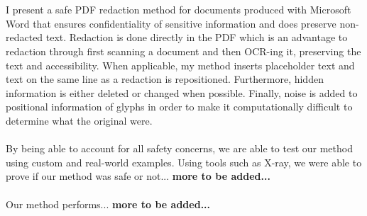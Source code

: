 \\\\
I present a safe PDF redaction method for documents produced with Microsoft Word that ensures confidentiality of sensitive information and does preserve non-redacted text. Redaction is done directly in the PDF which is an advantage to redaction through first scanning a document and then OCR-ing it, preserving the text and accessibility. When applicable, my method inserts placeholder text and text on the same line as a redaction is repositioned. Furthermore, hidden information is either deleted or changed when possible. Finally, noise is added to positional information of glyphs in order to make it computationally difficult to determine what the original were. 
\\\\
By being able to account for all safety concerns, we are able to test our method using custom and real-world examples. Using tools such as X-ray, we were able to prove if our method was safe or not... \textbf{more to be added...}
\\\\
Our method performs... \textbf{more to be added...}


